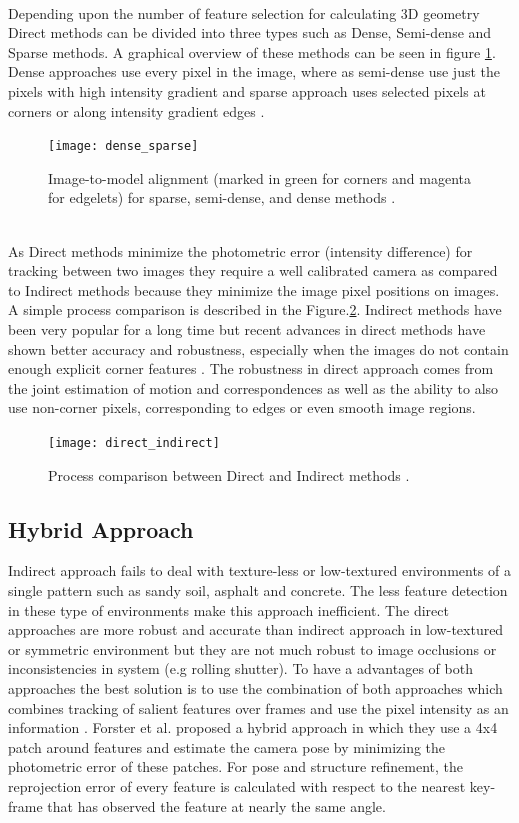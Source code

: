 \\ 
Depending upon the number of feature selection for calculating 3D geometry Direct methods can be divided into three types such as Dense, Semi-dense and Sparse methods. A graphical overview of these methods can be seen in figure \ref{fig:dense_sparse}. Dense approaches use every pixel in the image, where as semi-dense use just the pixels with high intensity gradient and sparse approach uses selected pixels at corners or along intensity gradient edges \cite{engel14eccv}.
\newline
\begin{figure}[h]
	\centering
	\texttt{[image: dense\_sparse]}
	\caption{Image-to-model alignment (marked in green for corners and magenta for
		edgelets) for sparse, semi-dense, and dense methods \cite{7782863}.}
	\label{fig:dense_sparse}
\end{figure}
\\
As Direct methods minimize the photometric error (intensity difference) for tracking between two images they require a well calibrated camera as compared to Indirect methods because they minimize the image pixel positions on images. A simple process comparison is described in the Figure.\ref{fig:direct_indirect}. Indirect methods have been very popular for a long time but recent advances in direct methods have shown better accuracy and robustness, especially when the images do not contain enough explicit corner features \cite{Engel-et-al-pami2018}. The robustness in direct approach comes from the joint estimation of motion and correspondences as well as the ability to also use non-corner pixels, corresponding to edges or even smooth image regions\cite{gao2018ldso}.
\begin{figure}[h]
	\centering
	\texttt{[image: direct\_indirect]}
	\caption{Process comparison between Direct and Indirect methods \cite{engel14eccv}.}
	\label{fig:direct_indirect}
\end{figure}
\subsection{Hybrid Approach}
Indirect approach fails to deal with texture-less or low-textured environments of a single pattern such as sandy soil, asphalt and concrete. The less feature detection in these type of environments make this approach inefficient. The direct approaches are more robust and accurate than indirect approach in low-textured or symmetric environment but they are not much robust to image occlusions or inconsistencies in system (e.g rolling shutter). To have a advantages of both approaches the best solution is to use the combination of both approaches which combines tracking of salient features over frames and use the pixel intensity as an information \cite{Aqel-et-al-2016}. Forster et al.\cite{7782863} proposed a hybrid approach in which they use a 4x4 patch around features and estimate the camera pose by minimizing the photometric error of these patches. For pose and structure refinement, the reprojection error of every feature is calculated with respect to the nearest key-frame that has observed the feature at nearly the same angle.

